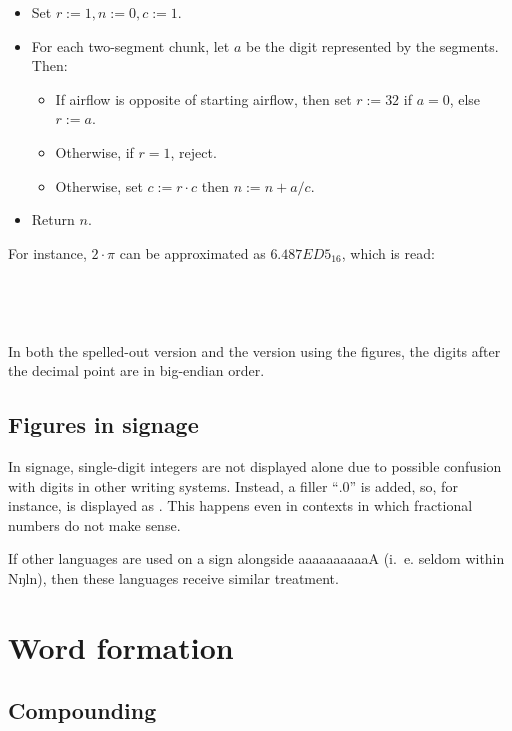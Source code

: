 \documentclass{book}
\newcommand{\lname}{aaaaaaaaaaA}
\begin{document}
\begin{itemize}
  \item Set $r := 1, n := 0, c := 1$.
  \item For each two-segment chunk, let $a$ be the digit represented by the segments. Then:
  \begin{itemize}
    \item If airflow is opposite of starting airflow, then set $r := 32$ if $a = 0$, else $r := a$.
    \item Otherwise, if $r = 1$, reject.
    \item Otherwise, set $c := r \cdot c$ then $n := n + a / c$.
  \end{itemize}
  \item Return $n$.
\end{itemize}

For instance, $2 \cdot \pi$ can be approximated as $6.487ED5_{16}$, which is read: \\
~\\
 \\
 \\
 \\

In both the spelled-out version and the version using the figures, the digits after the decimal point are in big-endian order.

\section{Figures in signage}

In signage, single-digit integers are not displayed alone due to possible confusion with digits in other writing systems. Instead, a filler ``$.0$'' is added, so, for instance,  is displayed as . This happens even in contexts in which fractional numbers do not make sense.

If other languages are used on a sign alongside \lname{} (i.~e. seldom within Nŋln), then these languages receive similar treatment.

\chapter{Word formation}

\section{Compounding}
\end{document}

